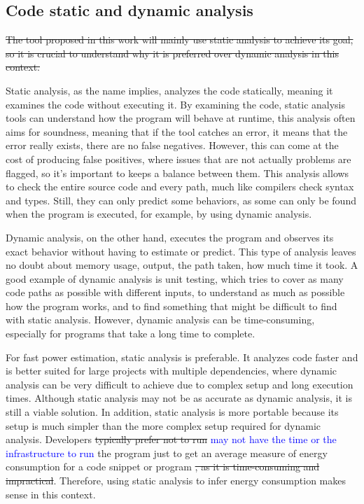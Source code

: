 \documentclass[sigplan]{acmart}
\newcommand{\wnote}[1]{\textcolor{blue}{#1}}
\begin{document}
\subsection{Code static and dynamic analysis} \label{sec:background_static_dynamic_analysis}
\st{The tool proposed in this work will mainly use static analysis to achieve its goal, so it is crucial to understand why it is preferred over dynamic analysis in this context.}

Static analysis, as the name implies, analyzes the code statically, meaning it examines the code without executing it. By examining the code, static analysis tools can understand how the program will behave at runtime\cite{ernst2003static}, this analysis often aims for soundness, meaning that if the tool catches an error, it means that the error really exists, there are no false negatives. However, this can come at the cost of producing false positives, where issues that are not actually problems are flagged, so it's important to keeps a balance between them. This analysis allows to check the entire source code and every path, much like compilers check syntax and types. Still, they can only predict some behaviors, as some can only be found when the program is executed, for example, by using dynamic analysis.

Dynamic analysis, on the other hand, executes the program and observes its exact behavior without having to estimate or predict. This type of analysis leaves no doubt about memory usage, output, the path taken, how much time it took\cite{ernst2003static}. A good example of dynamic analysis is unit testing, which tries to cover as many code paths as possible with different inputs, to understand as much as possible how the program works, and to find something that might be difficult to find with static analysis. However, dynamic analysis can be time-consuming, especially for programs that take a long time to complete.

For fast power estimation, static analysis is preferable. It analyzes code faster and is better suited for large projects with multiple dependencies, where dynamic analysis can be very difficult to achieve due to complex setup and long execution times. Although static analysis may not be as accurate as dynamic analysis, it is still a viable solution. In addition, static analysis is more portable because its setup is much simpler than the more complex setup required for dynamic analysis.
Developers \st{typically prefer not to run} \wnote{may not have the time or the infrastructure to run} the program just to get an average measure of energy consumption for a code snippet or program \st{, as it is time-consuming and impractical}. Therefore, using static analysis to infer energy consumption makes sense in this context.
\end{document}
